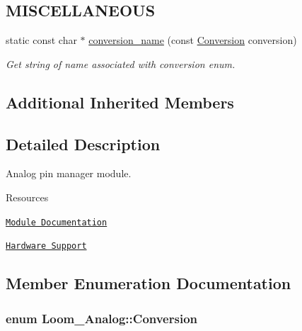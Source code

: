 \subsection*{M\+I\+S\+C\+E\+L\+L\+A\+N\+E\+O\+US}
\begin{DoxyCompactItemize}
\item 
static const char $\ast$ \hyperlink{class_loom___analog_a9bd686a057aaa43611665bd344fd7cac}{conversion\+\_\+name} (const \hyperlink{class_loom___analog_a83079adfd115a272351323429cefad46}{Conversion} conversion)
\begin{DoxyCompactList}\small\item\em Get string of name associated with conversion enum. \end{DoxyCompactList}\end{DoxyCompactItemize}
\subsection*{Additional Inherited Members}


\subsection{Detailed Description}
Analog pin manager module. 

\begin{DoxyParagraph}{Resources}

\begin{DoxyItemize}
\item \href{https://openslab-osu.github.io/Loom/html/class_loom___analog.html}{\tt Module Documentation}
\item \href{https://github.com/OPEnSLab-OSU/Loom/wiki/Hardware-Support#spi-sensors}{\tt Hardware Support} 
\end{DoxyItemize}
\end{DoxyParagraph}


\subsection{Member Enumeration Documentation}
\subsubsection[{\texorpdfstring{Conversion}{Conversion}}]{\setlength{\rightskip}{0pt plus 5cm}enum {\bf Loom\+\_\+\+Analog\+::\+Conversion}\hspace{0.3cm}{\ttfamily [strong]}}\hypertarget{class_loom___analog_a83079adfd115a272351323429cefad46}{}\label{class_loom___analog_a83079adfd115a272351323429cefad46}


